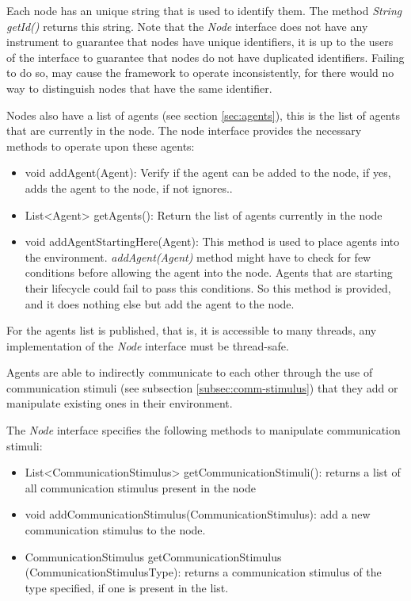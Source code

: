 Each node has an unique string that is used to identify them. The method \emph{String getId()} returns this string. Note that the \emph{Node} interface does not have any instrument to guarantee that nodes have unique identifiers, it is up to the users of the interface to guarantee that nodes do not have duplicated identifiers. Failing to do so, may cause the framework to operate inconsistently, for there would no way to distinguish nodes that have the same identifier. 

Nodes also have a list of agents (see section \ref{sec:agents}), this is the list of agents that are currently in the node. The node interface provides the necessary methods to operate upon these agents:

\begin{itemize}
  \item void addAgent(Agent): Verify if the agent can be added to the node, if yes, adds the agent to the node, if not ignores..
  \item List<Agent> getAgents(): Return the list of agents currently in the node
  \item void addAgentStartingHere(Agent): This method is used to place agents into the environment. \emph{addAgent(Agent)} method might have to check for few conditions before allowing the agent into the node. Agents that are starting their lifecycle could fail to pass this conditions. So this method is provided, and it does nothing else but add the agent to the node.
\end{itemize}

For the agents list is published, that is, it is accessible to many threads, any implementation of the \emph{Node} interface must be thread-safe.

Agents are able to indirectly communicate to each other through the use of communication stimuli (see subsection \ref{subsec:comm-stimulus}) that they add or manipulate existing ones in their environment.

The \emph{Node} interface specifies the following methods to manipulate communication stimuli:

\begin{itemize}
  \item List<CommunicationStimulus> getCommunicationStimuli(): returns a list of all communication stimulus present in the node
  
  \item void addCommunicationStimulus(CommunicationStimulus): add a new communication stimulus to the node.
  
  \item CommunicationStimulus getCommunicationStimulus (CommunicationStimulusType): returns a communication stimulus of the type specified, if one is present in the list.
\end{itemize}

